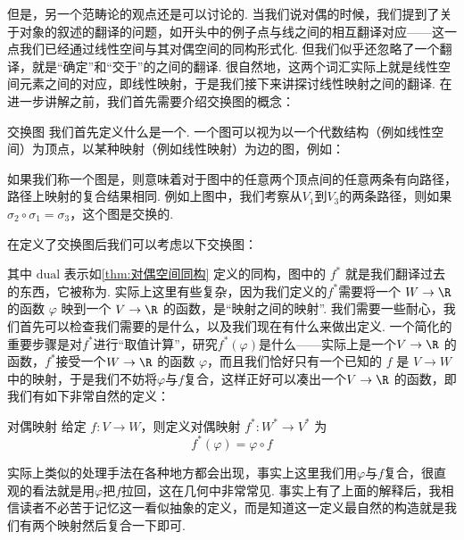 但是，另一个范畴论的观点还是可以讨论的. 当我们说对偶的时候，我们提到了关于对象的叙述的翻译的问题，如开头中的例子点与线之间的相互翻译对应——这一点我们已经通过线性空间与其对偶空间的同构形式化. 但我们似乎还忽略了一个翻译，就是``确定''和``交于''的之间的翻译. 很自然地，这两个词汇实际上就是线性空间元素之间的对应，即线性映射，于是我们接下来讲探讨线性映射之间的翻译. 在进一步讲解之前，我们首先需要介绍交换图的概念：
\begin{definition}{交换图}{}
    我们首先定义什么是一个. 一个图可以视为以一个代数结构（例如线性空间）为顶点，以某种映射（例如线性映射）为边的图，例如：
    \begin{center}
    \end{center}
    如果我们称一个图是，则意味着对于图中的任意两个顶点间的任意两条有向路径，路径上映射的复合结果相同. 例如上图中，我们考察从$V_1$到$V_3$的两条路径，则如果$\sigma_2\circ\sigma_1=\sigma_3$，这个图是交换的.
\end{definition}

在定义了交换图后我们可以考虑以下交换图：
\begin{center}
\end{center}
其中 $\text{dual}$ 表示如\autoref{thm:对偶空间同构} 定义的同构，图中的 $f^*$ 就是我们翻译过去的东西，它被称为. 实际上这里有些复杂，因为我们定义的$f^*$需要将一个 $W \to \R$ 的函数 $\varphi$ 映到一个 $V \to \R$ 的函数，是``映射之间的映射''. 我们需要一些耐心，我们首先可以检查我们需要的是什么，以及我们现在有什么来做出定义. 一个简化的重要步骤是对$f^*$进行``取值计算''，研究$f^*(\varphi)$是什么——实际上是一个$V \to \R$ 的函数，$f^*$接受一个$W \to \R$ 的函数 $\varphi$，而且我们恰好只有一个已知的 $f$ 是 $V\to W$ 中的映射，于是我们不妨将$\varphi$与$f$复合，这样正好可以凑出一个$V \to \R$ 的函数，即我们有如下非常自然的定义：
\begin{definition}{}{对偶映射}
    给定 $f\colon V \to W$，则定义对偶映射 $f^*: W^* \to V^*$ 为
    \[f^*(\varphi) = \varphi \circ f\]
\end{definition}
实际上类似的处理手法在各种地方都会出现，事实上这里我们用$\varphi$与$f$复合，很直观的看法就是用$\varphi$把$f$拉回，这在几何中非常常见. 事实上有了上面的解释后，我相信读者不必苦于记忆这一看似抽象的定义，而是知道这一定义最自然的构造就是我们有两个映射然后复合一下即可.

